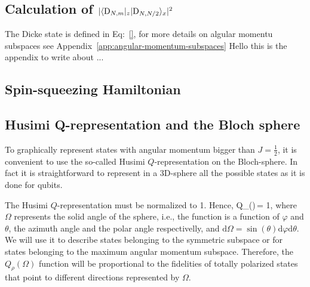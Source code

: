 \subsection{Calculation of $|\langle{\ensuremath{\textnormal{D}_{N,m}}}\vert{_z}\vert{\ensuremath{\textnormal{D}_{N,N/2}}}\rangle_x|^2$}
\label{app:calculation-dicke-overlap}

The Dicke state is defined in Eq:~\eqref{}, for more details on algular momentu subspaces see Appendix~\ref{app:angular-momentum-subspaces}
Hello this is the appendix to write about ...

\subsection{Spin-squeezing Hamiltonian}
\label{app:spin-squeezing-hamiltonian}

\subsection{Husimi Q-representation and the Bloch sphere}
\label{app:husimi-representation}

To graphically represent states with angular momentum bigger than $J=\frac{1}{2}$, it is convenient to use the so-called Husimi $Q$-representation on the Bloch-sphere.
In fact it is straightforward to represent in a 3D-sphere all the possible states as it is done for qubits.

The Husimi $Q$-representation must be normalized to 1.
Hence,
\be
  \label{eq:ap2-husimi-integral-to-one}
  \int Q_\rho(\Omega)\,\Omega = 1,
\ee
where $\Omega$ represents the solid angle of the sphere, i.e., the function is a function of $\varphi$ and $\theta$, the azimuth angle and the polar angle respectivelly, and $\text{d}\Omega= \sin(\theta)\text{d}\varphi\text{d}\theta$.
We will use it to describe states belonging to the symmetric subspace or for states belonging to the maximum angular momentum subspace.
Therefore, the $Q_\rho(\Omega)$ function will be proportional to the fidelities of totally polarized states that point to different directions represented by $\Omega$.

